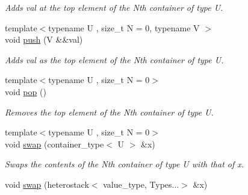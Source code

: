 \begin{DoxyCompactItemize}
\begin{DoxyCompactList}\small\item\em Adds val at the top element of the Nth container of type U. \end{DoxyCompactList}\item 
\hypertarget{classheterogeneous_1_1heterostack_3_01_t_00_01_types_8_8_8_4_a7613c4c72e7d0c42721e6c2bd7e1e4df}{}{\footnotesize template$<$typename U , size\+\_\+t N = 0, typename V $>$ }\\void \hyperlink{classheterogeneous_1_1heterostack_3_01_t_00_01_types_8_8_8_4_a7613c4c72e7d0c42721e6c2bd7e1e4df}{push} (V \&\&val)\label{classheterogeneous_1_1heterostack_3_01_t_00_01_types_8_8_8_4_a7613c4c72e7d0c42721e6c2bd7e1e4df}

\begin{DoxyCompactList}\small\item\em Adds val as the top element of the Nth container of type U. \end{DoxyCompactList}\item 
\hypertarget{classheterogeneous_1_1heterostack_3_01_t_00_01_types_8_8_8_4_a47194fbd326bd716f2aaac4614b98773}{}{\footnotesize template$<$typename U , size\+\_\+t N = 0$>$ }\\void \hyperlink{classheterogeneous_1_1heterostack_3_01_t_00_01_types_8_8_8_4_a47194fbd326bd716f2aaac4614b98773}{pop} ()\label{classheterogeneous_1_1heterostack_3_01_t_00_01_types_8_8_8_4_a47194fbd326bd716f2aaac4614b98773}

\begin{DoxyCompactList}\small\item\em Removes the top element of the Nth container of type U. \end{DoxyCompactList}\item 
\hypertarget{classheterogeneous_1_1heterostack_3_01_t_00_01_types_8_8_8_4_a2cf0da87044dff1c9d6ed98c7b48dfbd}{}{\footnotesize template$<$typename U , size\+\_\+t N = 0$>$ }\\void \hyperlink{classheterogeneous_1_1heterostack_3_01_t_00_01_types_8_8_8_4_a2cf0da87044dff1c9d6ed98c7b48dfbd}{swap} (container\+\_\+type$<$ U $>$ \&x)\label{classheterogeneous_1_1heterostack_3_01_t_00_01_types_8_8_8_4_a2cf0da87044dff1c9d6ed98c7b48dfbd}

\begin{DoxyCompactList}\small\item\em Swaps the contents of the Nth container of type U with that of x. \end{DoxyCompactList}\item 
\hypertarget{classheterogeneous_1_1heterostack_3_01_t_00_01_types_8_8_8_4_aae7b601dc160eb01aaa9e100354da122}{}void \hyperlink{classheterogeneous_1_1heterostack_3_01_t_00_01_types_8_8_8_4_aae7b601dc160eb01aaa9e100354da122}{swap} (heterostack$<$ value\+\_\+type, Types...$>$ \&x)\label{classheterogeneous_1_1heterostack_3_01_t_00_01_types_8_8_8_4_aae7b601dc160eb01aaa9e100354da122}


\end{DoxyCompactItemize}
